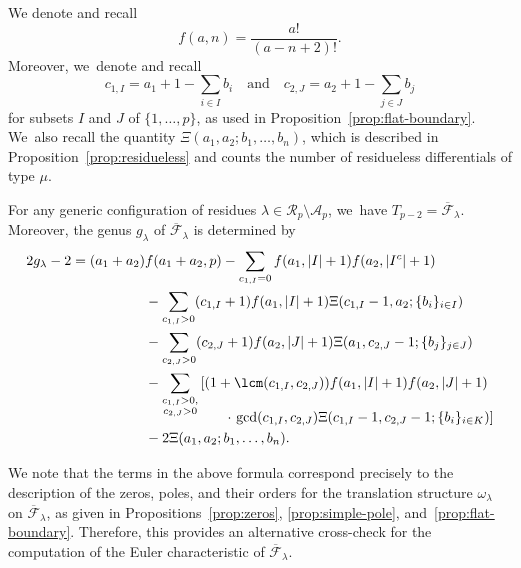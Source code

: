 We denote and recall
\[
f(a,n) = \frac{a!}{(a-n+2)!}.
\]
Moreover, we~denote and recall
\[
c_{1,I} = a_1 + 1 - \sum_{i\in I}b_i \quad \text{and} \quad c_{2,J} = a_2 + 1 - \sum_{j\in J}b_j
\]
for subsets $I$ and $J$ of $\{1,\ldots, p\}$, as used in Proposition~\ref{prop:flat-boundary}. We~also recall the quantity $\Xi(a_1,a_2;b_1,\ldots, b_n)$, which is described in Proposition~\ref{prop:residueless} and counts the number of residueless differentials of type $\mu$.

\begin{prop}
\label{prop:T=F}
For any generic configuration of residues $\lambda\in \mathcal{R}_p\setminus \mathcal{A}_p$, we~have $T_{p-2}=\overline{\mathcal F}_\lambda$. Moreover, the genus $g_{\lambda}$ of $\overline{\mathcal F}_\lambda$ is determined by
\begin{align*}
2g_\lambda-2 = (a_1+a_2)&f(a_1+a_2, p) - \sum_{c_{1,I}=0} f(a_1, |I|+1)f(a_2,|I^c|+1)\\
& - \sum_{c_{1,I}>0} (c_{1,I}+1)f(a_1,|I|+1)\Xi(c_{1,I}-1,a_{2};\{b_i\}_{i\in I})\\
& - \sum_{c_{2,J}>0} (c_{2,J}+1)f(a_2,|J|+1)\Xi(a_{1}, c_{2,J}-1;\{b_j\}_{j\in J})\\
& -\sum_{\substack{c_{1,I}>0, \\ c_{2,J}>0}}\left[(1+\lcm(c_{1,I},c_{2,J}))f(a_1,|I|+1)f(a_2,|J|+1)\right.\\[-10pt]
& \hspace*{2cm}\cdot\left.\gcd(c_{1,I},c_{2,J})\Xi(c_{1,I}-1,c_{2,J}-1;\{b_i\}_{i\in K})\right]\\
&-2\Xi(a_1,a_2;b_1,\ldots, b_n).
\end{align*}
\end{prop}

We note that the terms in the above formula correspond precisely to the description of the zeros, poles, and their orders for the translation structure $\omega_\lambda$ on $\overline{\mathcal F}_\lambda$, as given in Propositions~\ref{prop:zeros}, \ref{prop:simple-pole}, and~\ref{prop:flat-boundary}. Therefore, this provides an alternative cross-check for the computation of the Euler characteristic of $\overline{\mathcal F}_\lambda$.

